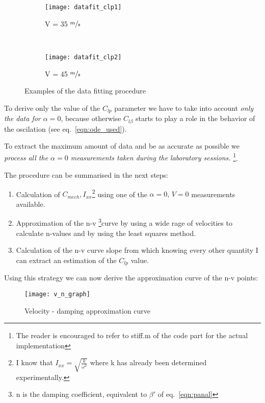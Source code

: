 \begin{figure}[H]
        \centering
        \begin{subfigure}[b]{0.48\textwidth}
                \texttt{[image: datafit\_clp1]}
                \caption{V = 35 $\sfrac{m}{s}$}
                \label{fig:datafit1}
        \end{subfigure}%
        ~
        \begin{subfigure}[b]{0.48\textwidth}
                \texttt{[image: datafit\_clp2]}
                \caption{V = 45 $\sfrac{m}{s}$}
                \label{fig:datafit2}
        \end{subfigure}

        \caption{Examples of the data fitting procedure}
\end{figure}

To derive only the value of the $C_{lp}$ parameter we have to take into account \textit{only the data for $\alpha = 0$},
because otherwise $C_{l\beta}$ starts to play a role in the behavior of the oscilation (see eq.~\ref{eqn:ode_used}).

To extract the maximum amount of data and be as accurate as possible we \textit{process all the $\alpha = 0$ measurements taken during the laboratory sessions.}
\footnote{The reader is encouraged to refer to stiff.m of the code part for the actual implementation}.

The procedure can be summarised in the next steps:
\begin{enumerate}
    \item Calculation of $C_{mech}, I_{xx}$\footnote{I know that $I_{xx} = \sqrt{\frac{k}{\omega^2}}$ where k
    has already been determined experimentally.} using one of the  $\alpha = 0,\, V = 0$ measurements available.
    \item Approximation of the n-v \footnote{n is the damping coefficient, equivalent to $\beta'$ of eq.~\ref{eqn:panal}}curve by using a wide rage of velocities to calculate n-values and by using the least squares method.
    \item Calculation of the n-v  curve slope from which knowing every other quantity I can extract an estimation of the $C_{lp}$ value.
\end{enumerate}

Using this strategy we can now derive the approximation curve of the n-v points:
\begin{figure}[H]
    \begin{center}
        \texttt{[image: v\_n\_graph]} %
    \end{center}
    \caption{Velocity - damping approximation curve}
    \label{fig:v_n_graph}
\end{figure}

